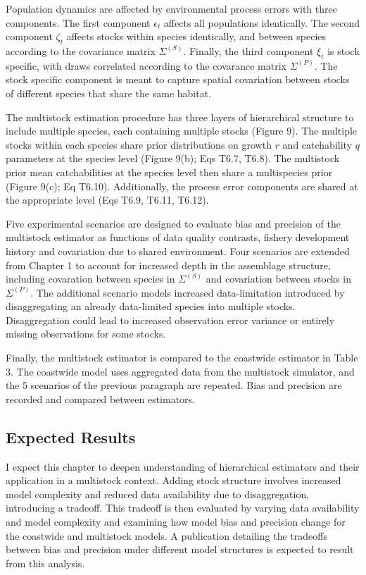 \documentclass[12pt,]{scrartcl}
\begin{document}
Population dynamics are affected by environmental process errors with
three components. The first component \(\epsilon_t\) affects all
populations identically. The second component \(\zeta_t\) affects stocks
within species identically, and between species according to the
covariance matrix \(\Sigma^{(S)}\). Finally, the third component
\(\xi_t\) is stock specific, with draws correlated according to the
covarance matrix \(\Sigma^{(P)}\). The stock specific component is meant
to capture spatial covariation between stocks of different species that
share the same habitat.

The multistock estimation procedure has three layers of hierarchical
structure to include multiple species, each containing multiple stocks
(Figure 9). The multiple stocks within each species share prior
distributions on growth \(r\) and catchability \(q\) parameters at the
species level (Figure 9(b); Eqs T6.7, T6.8). The multistock prior mean
catchabilities at the species level then share a multispecies prior
(Figure 9(c); Eq T6.10). Additionally, the process error components are
shared at the appropriate level (Eqs T6.9, T6.11, T6.12).

Five experimental scenarios are designed to evaluate bias and precision
of the multistock estimator as functions of data quality contrasts,
fishery development history and covariation due to shared environment.
Four scenarios are extended from Chapter 1 to account for increased
depth in the assemblage structure, including covaration between species
in \(\Sigma^{(S)}\) and covariation between stocks in \(\Sigma^{(P)}\).
The additional scenario models increased data-limitation introduced by
disaggregating an already data-limited species into multiple stocks.
Disaggregation could lead to increased observation error variance or
entirely missing observations for some stocks.

Finally, the multistock estimator is compared to the coastwide estimator
in Table 3. The coastwide model uses aggregated data from the multistock
simulator, and the 5 scenarios of the previous paragraph are repeated.
Bias and precision are recorded and compared between estimators.

\subsection{Expected Results}\label{expected-results-1}

I expect this chapter to deepen understanding of hierarchical estimators
and their application in a multistock context. Adding stock structure
involves increased model complexity and reduced data availability due to
disaggregation, introducing a tradeoff. This tradeoff is then evaluated
by varying data availability and model complexity and examining how
model bias and precision change for the coastwide and multistock models.
A publication detailing the tradeoffs between bias and precision under
different model structures is expected to result from this analysis.
\end{document}
